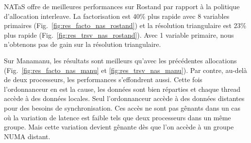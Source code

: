 NATaS offre de meilleures performances sur Rostand par rapport à la politique d'allocation interleave.
%
La factorisation est 40\% plus rapide avec 8 variables primaires (Fig.~\ref{fig:res_facto_nas_rostand}) et la résolution triangulaire est 23\% plus rapide (Fig.~\ref{fig:res_trsv_nas_rostand}).
%
Avec 1 variable primaire, nous n'obtenons pas de gain sur la résolution triangulaire.


Sur Manamanu, les résultats sont meilleurs qu'avec les précédentes allocations (Fig.~\ref{fig:res_facto_nas_manu} et \ref{fig:res_trsv_nas_manu}).
%
Par contre, au-delà de deux processeurs, les performances s'effondrent aussi.
%
Cette fois l'ordonnanceur en est la cause, les données sont bien réparties et chaque thread accède à des données locales.
%
Seul l'ordonnanceur accède à des données distantes pour des besoins de synchronisation.
%
Ces accès ne sont pas gênants dans un cas où la variation de latence est faible tels que deux processeurs dans un même groupe.
%
Mais cette variation devient gênante dès que l'on accède à un groupe NUMA distant.
